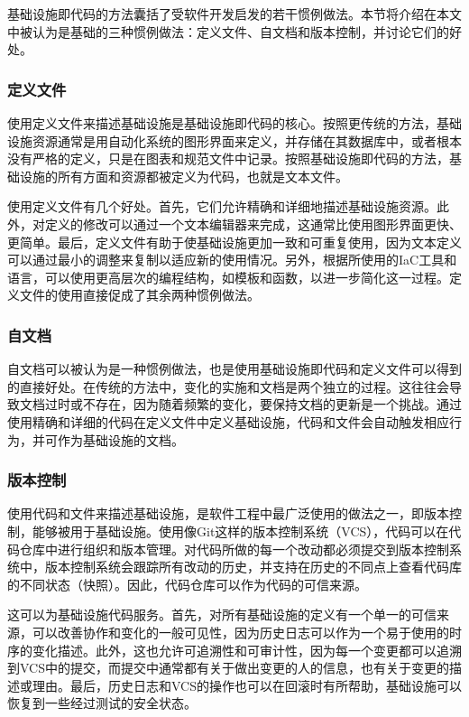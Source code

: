 \documentclass[macfonts,master]{njuthesis}
\begin{document}
基础设施即代码的方法囊括了受软件开发启发的若干惯例做法。本节将介绍在本文中被认为是基础的三种惯例做法：定义文件、自文档和版本控制，并讨论它们的好处。

\subsubsection{定义文件}

使用定义文件来描述基础设施是基础设施即代码的核心。按照更传统的方法，基础设施资源通常是用自动化系统的图形界面来定义，并存储在其数据库中，或者根本没有严格的定义，只是在图表和规范文件中记录。按照基础设施即代码的方法，基础设施的所有方面和资源都被定义为代码，也就是文本文件\cite{morris2016infrastructure}。

使用定义文件有几个好处。首先，它们允许精确和详细地描述基础设施资源。此外，对定义的修改可以通过一个文本编辑器来完成，这通常比使用图形界面更快、更简单。最后，定义文件有助于使基础设施更加一致和可重复使用，因为文本定义可以通过最小的调整来复制以适应新的使用情况。另外，根据所使用的IaC工具和语言，可以使用更高层次的编程结构，如模板和函数，以进一步简化这一过程\cite{morris2016infrastructure}\cite{whatisiac}。定义文件的使用直接促成了其余两种惯例做法。

\subsubsection{自文档}

自文档可以被认为是一种惯例做法，也是使用基础设施即代码和定义文件可以得到的直接好处。在传统的方法中，变化的实施和文档是两个独立的过程。这往往会导致文档过时或不存在，因为随着频繁的变化，要保持文档的更新是一个挑战。通过使用精确和详细的代码在定义文件中定义基础设施，代码和文件会自动触发相应行为，并可作为基础设施的文档\cite{morris2016infrastructure}\cite{whatisiac}。

\subsubsection{版本控制}

使用代码和文件来描述基础设施，是软件工程中最广泛使用的做法之一，即版本控制，能够被用于基础设施。使用像Git这样的版本控制系统（VCS），代码可以在代码仓库中进行组织和版本管理。对代码所做的每一个改动都必须提交到版本控制系统中，版本控制系统会跟踪所有改动的历史，并支持在历史的不同点上查看代码库的不同状态（快照）。因此，代码仓库可以作为代码的可信来源。

这可以为基础设施代码服务。首先，对所有基础设施的定义有一个单一的可信来源，可以改善协作和变化的一般可见性，因为历史日志可以作为一个易于使用的时序的变化描述。此外，这也允许可追溯性和可审计性，因为每一个变更都可以追溯到VCS中的提交，而提交中通常都有关于做出变更的人的信息，也有关于变更的描述或理由。最后，历史日志和VCS的操作也可以在回滚时有所帮助，基础设施可以恢复到一些经过测试的安全状态。
\end{document}
